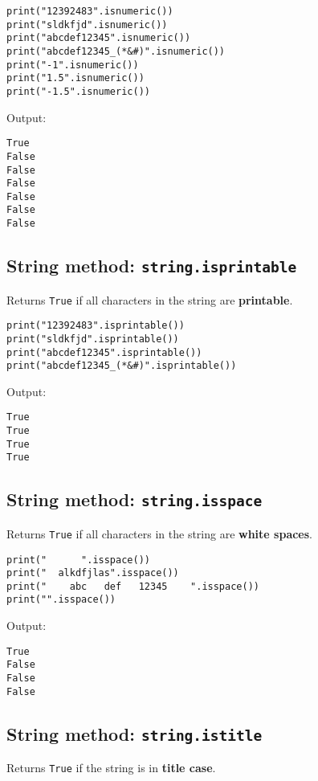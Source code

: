 \documentclass[11pt]{article}
\begin{document}
\begin{verbatim}
print("12392483".isnumeric())
print("sldkfjd".isnumeric())
print("abcdef12345".isnumeric())
print("abcdef12345_(*&#)".isnumeric())
print("-1".isnumeric())
print("1.5".isnumeric())
print("-1.5".isnumeric())
\end{verbatim}

 \noindent Output:

\label{org003f77e}
\begin{verbatim}
True
False
False
False
False
False
False
\end{verbatim}
\subsection{String method: \texttt{string.isprintable}}
\label{sec:org4f033d0}
Returns \texttt{True} if all characters in the string are \textbf{printable}.

\begin{verbatim}
print("12392483".isprintable())
print("sldkfjd".isprintable())
print("abcdef12345".isprintable())
print("abcdef12345_(*&#)".isprintable())
\end{verbatim}

 \noindent Output:

\label{orgc3688e0}
\begin{verbatim}
True
True
True
True
\end{verbatim}


 \newpage
\subsection{String method: \texttt{string.isspace}}
\label{sec:org10d27e6}
Returns \texttt{True} if all characters in the string are \textbf{white spaces}.

\begin{verbatim}
print("      ".isspace())
print("  alkdfjlas".isspace())
print("    abc   def   12345    ".isspace())
print("".isspace())
\end{verbatim}

 \noindent Output:

\label{orgd11521b}
\begin{verbatim}
True
False
False
False
\end{verbatim}
\subsection{String method: \texttt{string.istitle}}
\label{sec:org688d4cd}
Returns \texttt{True} if the string is in \textbf{title case}.
\end{document}
